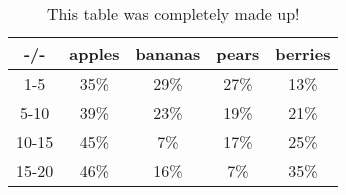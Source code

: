 \begin{table}[H]
\centering
\begin{tabular}{||c || c c c c||} 
\hline
-/- & apples & bananas & pears & berries\\ [0.5ex] 
 \hline\hline
 1-5 & 35\% & 29\% & 27\% & 13\%\\ 
 \hline
 5-10 & 39\% & 23\% & 19\% & 21\%\\
 \hline
 10-15 & 45\% & 7\% & 17\% & 25\%\\
 \hline
 15-20 & 46\% & 16\% & 7\% & 35\%\\
 \hline

\end{tabular}
\label{tab:percentage_use}
\caption{This table was completely made up!}
\end{table}